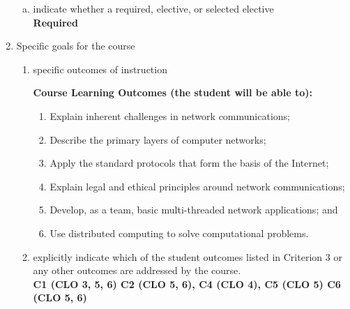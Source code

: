 \begin{enumerate}[1.]
\begin{enumerate}[a.]
\item indicate whether a required, elective, or selected elective\\ %
  {\bfseries
    Required
  }

\end{enumerate}

\item Specific goals for the course
\begin{enumerate}
\item specific outcomes of instruction\\ %
  {\bfseries
    Course Learning Outcomes (the student will be able to):
\begin{enumerate}[1.]
\item Explain inherent challenges in network communications;
\item Describe the primary layers of computer networks;
\item Apply the standard protocols that form the basis of the Internet;
\item Explain legal and ethical principles around network communications;
\item Develop, as a team, basic multi-threaded network applications; and
\item Use distributed computing to solve computational problems.
\end{enumerate}
  }

\item explicitly indicate which of the student outcomes listed in Criterion 3 or any other outcomes are addressed by the course.\\
  {\bfseries
    C1 (CLO 3, 5, 6)
    C2 (CLO 5, 6),
    C4 (CLO 4),
    C5 (CLO 5)
    C6 (CLO 5, 6)
  }
\end{enumerate}


\end{enumerate}
